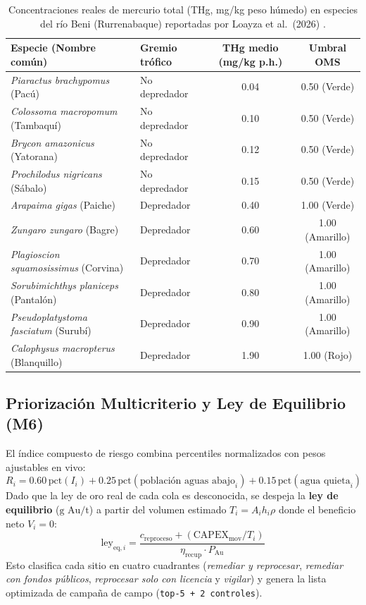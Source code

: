 \documentclass[11pt,a4paper]{article}
\begin{document}
\begin{table}[h]
\centering
\caption{Concentraciones reales de mercurio total (THg, mg/kg peso húmedo) en especies del río Beni (Rurrenabaque) reportadas por Loayza et al.\ (2026) \cite{loayza2026}.}
\begin{tabular}{llcc}
\toprule
\textbf{Especie (Nombre común)} & \textbf{Gremio trófico} & \textbf{THg medio (mg/kg p.h.)} & \textbf{Umbral OMS} \\
\midrule
\textit{Piaractus brachypomus} (Pacú) & No depredador & 0.04 & 0.50 (Verde) \\
\textit{Colossoma macropomum} (Tambaquí) & No depredador & 0.10 & 0.50 (Verde) \\
\textit{Brycon amazonicus} (Yatorana) & No depredador & 0.12 & 0.50 (Verde) \\
\textit{Prochilodus nigricans} (Sábalo) & No depredador & 0.15 & 0.50 (Verde) \\
\textit{Arapaima gigas} (Paiche) & Depredador & 0.40 & 1.00 (Verde) \\
\textit{Zungaro zungaro} (Bagre) & Depredador & 0.60 & 1.00 (Amarillo) \\
\textit{Plagioscion squamosissimus} (Corvina) & Depredador & 0.70 & 1.00 (Amarillo) \\
\textit{Sorubimichthys planiceps} (Pantalón) & Depredador & 0.80 & 1.00 (Amarillo) \\
\textit{Pseudoplatystoma fasciatum} (Surubí) & Depredador & 0.90 & 1.00 (Amarillo) \\
\textit{Calophysus macropterus} (Blanquillo) & Depredador & 1.90 & 1.00 (Rojo) \\
\bottomrule
\end{tabular}
\end{table}

\subsection{Priorización Multicriterio y Ley de Equilibrio (M6)}
El índice compuesto de riesgo combina percentiles normalizados con pesos ajustables en vivo:
\begin{equation}
  R_i = 0.60\,\text{pct}(I_i) + 0.25\,\text{pct}(\text{población aguas abajo}_i) + 0.15\,\text{pct}(\text{agua quieta}_i)
\end{equation}
Dado que la ley de oro real de cada cola es desconocida, se despeja la \textbf{ley de equilibrio} ($\text{g Au/t}$) a partir del volumen estimado $T_i = A_i h_i \rho$ donde el beneficio neto $V_i = 0$:
\begin{equation}
  \text{ley}_{\text{eq}, i} = \frac{c_{\text{reproceso}} + (\text{CAPEX}_{\text{mov}} / T_i)}{\eta_{\text{recup}} \cdot P_{\text{Au}}}
\end{equation}
Esto clasifica cada sitio en cuatro cuadrantes (\textit{remediar y reprocesar}, \textit{remediar con fondos públicos}, \textit{reprocesar solo con licencia} y \textit{vigilar}) y genera la lista optimizada de campaña de campo (\texttt{top-5 + 2 controles}).
\end{document}
